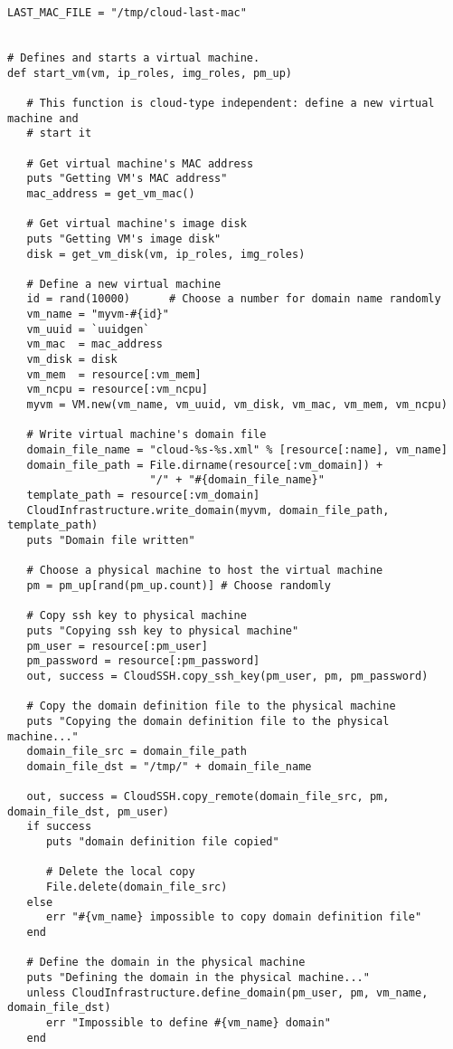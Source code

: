 \begin{lstlisting}
LAST_MAC_FILE = "/tmp/cloud-last-mac"


# Defines and starts a virtual machine.
def start_vm(vm, ip_roles, img_roles, pm_up)

   # This function is cloud-type independent: define a new virtual machine and
   # start it
   
   # Get virtual machine's MAC address
   puts "Getting VM's MAC address"
   mac_address = get_vm_mac()
   
   # Get virtual machine's image disk
   puts "Getting VM's image disk"
   disk = get_vm_disk(vm, ip_roles, img_roles)
   
   # Define a new virtual machine
   id = rand(10000)      # Choose a number for domain name randomly
   vm_name = "myvm-#{id}"
   vm_uuid = `uuidgen`
   vm_mac  = mac_address
   vm_disk = disk
   vm_mem  = resource[:vm_mem]
   vm_ncpu = resource[:vm_ncpu]
   myvm = VM.new(vm_name, vm_uuid, vm_disk, vm_mac, vm_mem, vm_ncpu)
   
   # Write virtual machine's domain file
   domain_file_name = "cloud-%s-%s.xml" % [resource[:name], vm_name]
   domain_file_path = File.dirname(resource[:vm_domain]) + 
                      "/" + "#{domain_file_name}"
   template_path = resource[:vm_domain]
   CloudInfrastructure.write_domain(myvm, domain_file_path, template_path)
   puts "Domain file written"
   
   # Choose a physical machine to host the virtual machine
   pm = pm_up[rand(pm_up.count)] # Choose randomly
   
   # Copy ssh key to physical machine
   puts "Copying ssh key to physical machine"
   pm_user = resource[:pm_user]
   pm_password = resource[:pm_password]
   out, success = CloudSSH.copy_ssh_key(pm_user, pm, pm_password)
   
   # Copy the domain definition file to the physical machine
   puts "Copying the domain definition file to the physical machine..."
   domain_file_src = domain_file_path
   domain_file_dst = "/tmp/" + domain_file_name
   
   out, success = CloudSSH.copy_remote(domain_file_src, pm, domain_file_dst, pm_user)
   if success
      puts "domain definition file copied"
      
      # Delete the local copy
      File.delete(domain_file_src)
   else
      err "#{vm_name} impossible to copy domain definition file"
   end
   
   # Define the domain in the physical machine
   puts "Defining the domain in the physical machine..."
   unless CloudInfrastructure.define_domain(pm_user, pm, vm_name, domain_file_dst)
      err "Impossible to define #{vm_name} domain"
   end
   

\end{lstlisting}
